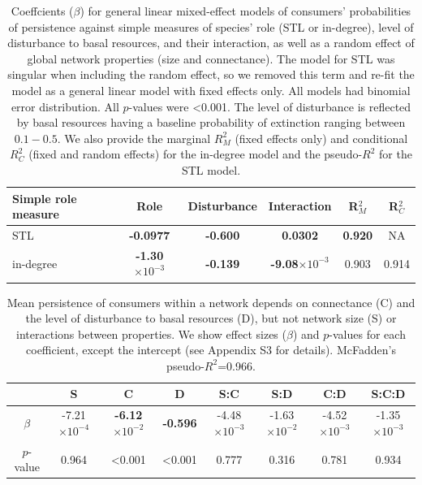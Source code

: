 \documentclass[12pt]{article}
\begin{document}
\begin{spacing}{2.0}
    \begin{table}[hb!]
        \caption{Coeffcients ($\beta$) for general linear mixed-effect models of consumers' probabilities of persistence against simple measures of species' role (STL or in-degree), level of disturbance to basal resources, and their interaction, as well as a random effect of global network properties (size and connectance). The model for STL was singular when including the random effect, so we removed this term and re-fit the model as a general linear model with fixed effects only. All models had binomial error distribution. All $p$-values were \textless0.001. The level of disturbance is reflected by basal resources having a baseline probability of extinction ranging between $0.1 - 0.5$.  We also provide the marginal $R^2_M$ (fixed effects only) and conditional $R^2_C$ (fixed and random effects) for the in-degree model and the pseudo-$R^2$ for the STL model.}
        \label{tab:per_vs_TLdeg}
        \centering
        \begin{tabular}{l|c  c  c | c c  }
            Simple role measure & Role & Disturbance & Interaction & R$^2_M$ & R$^2_C$ \\
            \hline
            STL & \textbf{-0.0977} & \textbf{-0.600} & \textbf{0.0302} & \textbf{0.920} & NA \\
            in-degree & \textbf{-1.30$\times10^{-3}$} & \textbf{-0.139} & \textbf{-9.08$\times10^{-3}$} & 0.903 & 0.914 \\
        \end{tabular}
    \end{table}


    
    \begin{table}[hb!]
        \caption{Mean persistence of consumers within a network depends on connectance (C) and the level of disturbance to basal resources (D), but not network size (S) or interactions between properties. We show effect sizes ($\beta$) and $p$-values for each coefficient, except the intercept (see Appendix S3 for details). McFadden's pseudo-$R^2$=0.966. }
        \label{tab:per_vs_SC}
        \centering
        \footnotesize
        \begin{tabular}{c| c c c c c c c}
              & S & C & D & S:C & S:D & C:D & S:C:D \\
            \hline
             $\beta$ &	 -7.21$\times10^{-4}$  	& \textbf{-6.12$\times10^{-2}$}	& \textbf{-0.596} &	 -4.48$\times10^{-3}$ &	 -1.63$\times10^{-2}$ 	& -4.52$\times10^{-3}$ &	 -1.35$\times10^{-3}$ \\
             $p$-value &		 0.964 &	 \textless0.001 &	 \textless0.001 &	 0.777 &	 0.316 &	 0.781 &	 0.934 \\
                    \end{tabular}
                \end{table}




\end{spacing}
\end{document}
